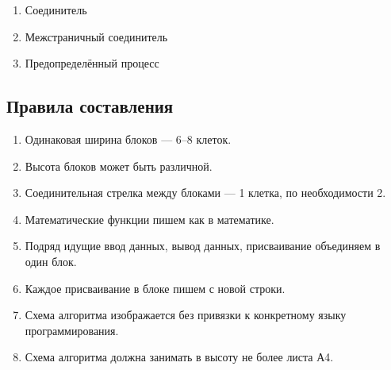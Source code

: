 \documentclass[a4paper, 12pt]{article}
\begin{document}
\begin{enumerate}[label=\arabic*)]
  \item \Needspace{3cm}Соединитель
    \begin{center}
    \end{center}

  \item \Needspace{3cm}Межстраничный соединитель
    \begin{center}
    \end{center}

  \item \Needspace{3cm}Предопределённый процесс
    \begin{center}
    \end{center}
\end{enumerate}

\subsection{Правила составления}

\begin{enumerate}[noitemsep, label=\arabic*)]
  \item Одинаковая ширина блоков --- 6--8 клеток.
  \item Высота блоков может быть различной.
  \item Соединительная стрелка между блоками --- 1 клетка, по необходимости 2.
  \item Математические функции пишем как в математике.
  \item Подряд идущие ввод данных, вывод данных, присваивание объединяем
    в один блок.
  \item Каждое присваивание в блоке пишем с новой строки.
  \item Схема алгоритма изображается без привязки к конкретному языку
    программирования.
  \item Схема алгоритма должна занимать в высоту не более листа А4.
\end{enumerate}
\end{document}
